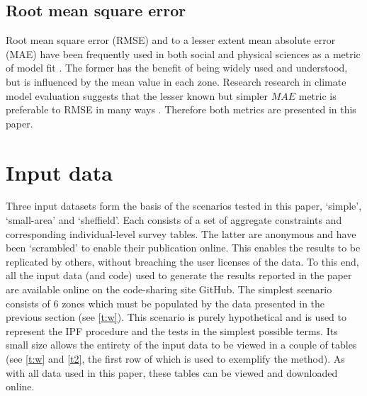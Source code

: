 \documentclass[a4paper,10pt]{article}
\begin{document}


\subsection{Root mean square error}
Root mean square error (RMSE) and to a lesser extent mean absolute error (MAE)
have been frequently
used in both social and physical sciences as a metric of model fit
\citep{Legates1999GOF,Ngo2012}. %
The former has the benefit of being widely used and understood, but is
influenced by the mean value in each zone. Research research in climate model
evaluation suggests that the lesser known but simpler $MAE$ metric is preferable
to RMSE in many ways \citep{Willmott2005}. Therefore both metrics are presented
in this paper.

\section{Input data}
Three input datasets form the basis of the scenarios tested in this paper,
`simple', `small-area' and `sheffield'. Each consists of a set of aggregate
constraints and corresponding individual-level survey tables.
The latter are anonymous and have been `scrambled' to enable their
publication online. This enables the results to be replicated by others,
without breaching the user licenses of the data.
To this end, all the input data (and code) used to generate the results reported
in the paper are available online on the code-sharing site GitHub.
The simplest scenario consists of 6 zones which must be populated by the
data presented in the previous section (see \cref{t:w}).
This scenario is purely hypothetical and is used to represent the IPF procedure
and the tests in the simplest possible terms. Its small size allows the entirety
of the input data to be viewed in a couple of tables 
(see \cref{t:w} and \cref{t2}, the first row of which is used
to exemplify the method). As with all
data used in this paper, these tables can be
viewed and downloaded online.
\end{document}
